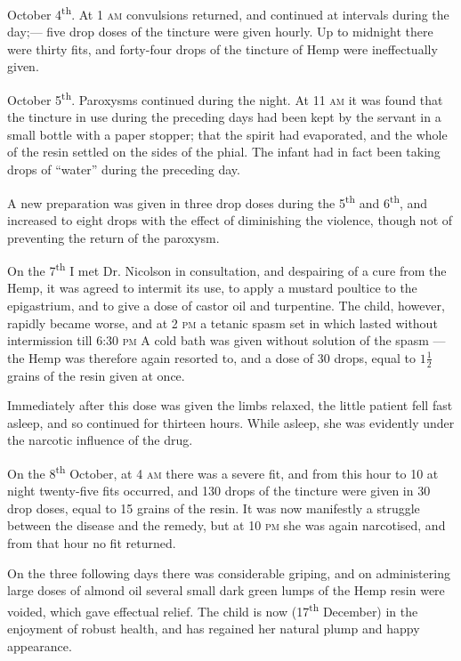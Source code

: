 \documentclass[a4paper, 11pt, oneside, polutonikogreek, english]{article}
\begin{document}
October 4\textsuperscript{th}. At 1 \textsc{am} convulsions returned, and continued at intervals during the day;--- five drop doses of the tincture were given hourly. Up to midnight there were thirty fits, and forty-four drops of the tincture of Hemp were ineffectually given.

October 5\textsuperscript{th}. Paroxysms continued during the night. At 11 \textsc{am} it was found that the tincture in use during the preceding days had been kept by the servant in a small bottle with a paper stopper; that the spirit had evaporated, and the whole of the resin settled on the sides of the phial. The infant had in fact been taking drops of ``water'' during the preceding day.

A new preparation was given in three drop doses during the 5\textsuperscript{th} and 6\textsuperscript{th}, and increased to eight drops with the effect of diminishing the violence, though not of preventing the return of the paroxysm.

On the 7\textsuperscript{th} I met Dr. Nicolson in consultation, and despairing of a cure from the Hemp, it was agreed to intermit its use, to apply a mustard poultice to the epigastrium, and to give a dose of castor oil and turpentine. The child, however, rapidly became worse, and at 2 \textsc{pm} a tetanic spasm set in which lasted without intermission till 6:30 \textsc{pm} A cold bath was given without solution of the spasm --- the Hemp was therefore again resorted to, and a dose of 30 drops, equal to $1\frac{1}{2}$ grains of the resin given at once.

Immediately after this dose was given the limbs relaxed, the little patient fell fast asleep, and so continued for thirteen hours. While asleep, she was evidently under the narcotic influence of the drug.

On the 8\textsuperscript{th} October, at 4 \textsc{am} there was a severe fit, and from this hour to 10 at night twenty-five fits occurred, and 130 drops of the tincture were given in 30 drop doses, equal to 15 grains of the resin. It was now manifestly a struggle between the disease and the remedy, but at 10 \textsc{pm} she was again narcotised, and from that hour no fit returned.

On the three following days there was considerable griping, and on administering large doses of almond oil several small dark green lumps of the Hemp resin were voided, which gave effectual relief. The child is now (17\textsuperscript{th} December) in the enjoyment of robust health, and has regained her natural plump and happy appearance.
\end{document}

